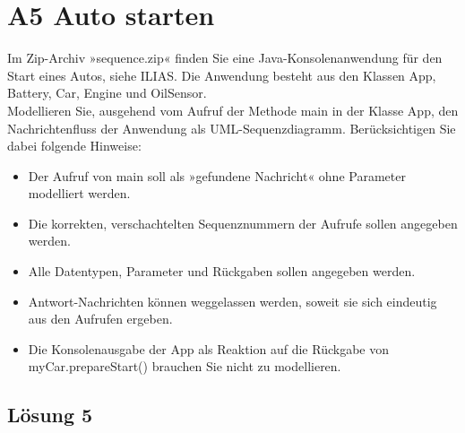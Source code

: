 \documentclass[main.tex]{subfiles}
\begin{document}
\section{A5 Auto starten}
Im Zip-Archiv »sequence.zip« finden Sie eine Java-Konsolenanwendung für den Start eines Autos, siehe ILIAS. Die Anwendung besteht aus den Klassen App, Battery, Car, Engine und OilSensor.\\

Modellieren Sie, ausgehend vom Aufruf der Methode main in der Klasse App, den Nachrichtenfluss der Anwendung als UML-Sequenzdiagramm. Berücksichtigen Sie dabei folgende Hinweise:

\begin{itemize}
    \item Der Aufruf von main soll als »gefundene Nachricht« ohne Parameter modelliert werden.
    \item Die korrekten, verschachtelten Sequenznummern der Aufrufe sollen angegeben werden.
    \item Alle Datentypen, Parameter und Rückgaben sollen angegeben werden.
    \item Antwort-Nachrichten können weggelassen werden, soweit sie sich eindeutig aus den Aufrufen ergeben.
    \item Die Konsolenausgabe der App als Reaktion auf die Rückgabe von myCar.prepareStart() brauchen Sie nicht zu modellieren.
\end{itemize}

\subsection{Lösung 5}
\end{document}
